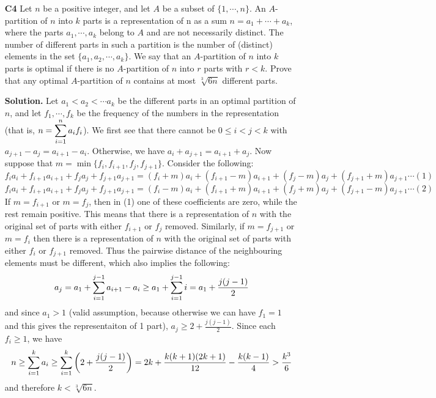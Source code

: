 \documentclass[11pt,a4paper]{article}
\begin{document}
\begin{enumerate}
	\item [\textbf{C4}] Let $n$ be a positive integer, and let $A$ be a subset of $\{ 1,\cdots ,n\}$. An $A$-partition of $n$ into $k$ parts is a representation of n as a sum $n = a_1 + \cdots + a_k$, where the parts $a_1 , \cdots , a_k $ belong to $A$ and are not necessarily distinct. The number of different parts in such a partition is the number of (distinct) elements in the set $\{ a_1 , a_2 , \cdots , a_k \} $.
	We say that an $A$-partition of $n$ into $k$ parts is optimal if there is no $A$-partition of $n$ into $r$ parts with $r<k$. Prove that any optimal $A$-partition of $n$ contains at most $\sqrt[3]{6n}$ different parts.
	
	\textbf{Solution.} Let $a_1<a_2<\cdots a_k$ be the different parts in an optimal partition of $n$, and let $f_1, \cdots , f_k$ be the frequency of the numbers in the representation 
	(that is, $n=\displaystyle\sum_{i=1}^n a_if_i$). 
	We first see that there cannot be $0\le i< j < k$ with $a_{j+1}-a_j=a_{i+1}-a_i$. 
	Otherwise, we have $a_i+a_{j+1}=a_{i+1}+a_j$. 
	Now suppose that $m = \min\{f_i, f_{i+1}, f_j, f_{j+1}\}$. Consider the following:
	\[f_ia_i+f_{i+1}a_{i+1}+f_ja_j+f_{j+1}a_{j+1}
	=(f_i+m)a_i+(f_{i+1}-m)a_{i+1}+(f_j-m)a_j+(f_{j+1}+m)a_{j+1}\cdots (1)
	\]
	\[f_ia_i+f_{i+1}a_{i+1}+f_ja_j+f_{j+1}a_{j+1}
	=(f_i-m)a_i+(f_{i+1}+m)a_{i+1}+(f_j+m)a_j+(f_{j+1}-m)a_{j+1}\cdots (2)
	\]
	If $m=f_{i+1}$ or $m=f_j$, then in (1) one of these coefficients are zero, while the rest remain positive. This means that there is a representation of $n$ with the original set of parts with either $f_{i+1}$ or $f_j$ removed. 
	Similarly, if $m=f_{j+1}$ or $m=f_i$ then there is a representation of $n$ with the original set of parts with either $f_i$ or $f_{j+1}$ removed. 
	Thus the pairwise distance of the neighbouring elements must be different, which also implies the following: 
	\[a_j=a_1+\displaystyle\sum_{i=1}^{j-1}a_{i+1}-a_i\ge a_1+\displaystyle\sum_{i=1}^{j-1}i=a_1+\frac{j(j-1)}{2}
	\]
	and since $a_1>1$ (valid assumption, because otherwise we can have $f_1=1$ and this gives the representaiton of 1 part), $a_j\ge 2+\frac{j(j-1)}{2}$. Since each $f_i\ge 1$, we have 
	\[
	n\ge \displaystyle\sum_{i=1}^k a_i
	\ge \displaystyle\sum_{i=1}^k \left(2 + \frac{j(j-1)}{2}\right)
	=2k+\frac{k(k+1)(2k+1)}{12}-\frac{k(k-1)}{4}
	>\frac{k^3}{6}
	\]
	and therefore $k<\sqrt[3]{6n}$. 
	
\end{enumerate}
\end{document}
